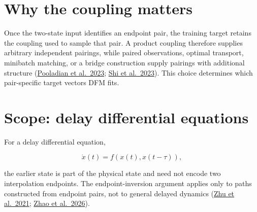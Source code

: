 \documentclass[11pt]{article}
\begin{document}
\section{Why the coupling matters}\label{coupling-choice}

Once the two-state input identifies an endpoint pair, the training target retains the coupling used to sample that pair. A product coupling therefore supplies arbitrary independent pairings, while paired observations, optimal transport, minibatch matching, or a bridge construction supply pairings with additional structure (\href{https://arxiv.org/abs/2304.14772}{Pooladian et al.~2023}; \href{https://arxiv.org/abs/2303.16852}{Shi et al.~2023}). This choice determines which pair-specific target vectors DFM fits.

\section{Scope: delay differential equations}\label{where-the-argument-does-not-apply}

For a delay differential equation,

\[
\dot x(t)=f(x(t),x(t-\tau)),
\]

the earlier state is part of the physical state and need not encode two interpolation endpoints. The endpoint-inversion argument applies only to paths constructed from endpoint pairs, not to general delayed dynamics (\href{https://arxiv.org/abs/2102.10801}{Zhu et al.~2021}; \href{https://openreview.net/forum?id=6lH1XblLpo}{Zhao et al.~2026}).
\end{document}
